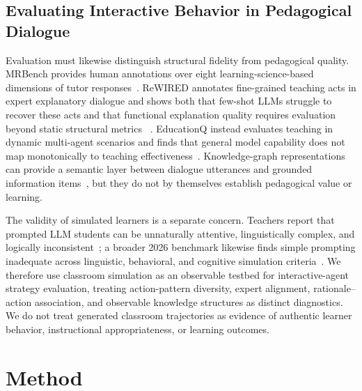 \documentclass[manuscript,review,anonymous]{acmart}
\begin{document}
\subsection{Evaluating Interactive Behavior in Pedagogical Dialogue}

Evaluation must likewise distinguish structural fidelity from pedagogical
quality. MRBench provides human annotations over eight learning-science-based
dimensions of tutor responses~\citep{maurya2025unifying}. ReWIRED annotates
fine-grained teaching acts in expert explanatory dialogue and shows both that
few-shot LLMs struggle to recover these acts and that functional explanation
quality requires evaluation beyond static structural metrics
~\citep{anagnostopoulou2025rewired}. EducationQ instead evaluates teaching in
dynamic multi-agent scenarios and finds that general model capability does not
map monotonically to teaching effectiveness~\citep{shi2025educationq}.
Knowledge-graph representations can provide a semantic layer between dialogue
utterances and grounded information items~\citep{schneider2024bridgekg}, but
they do not by themselves establish pedagogical value or learning.

The validity of simulated learners is a separate concern. Teachers report that
prompted LLM students can be unnaturally attentive, linguistically complex, and
logically inconsistent~\citep{martynova2025simulate}; a broader 2026 benchmark
likewise finds simple prompting inadequate across linguistic, behavioral, and
cognitive simulation criteria~\citep{scarlatos2026simulated}. We therefore use
classroom simulation as an observable testbed for interactive-agent strategy
evaluation, treating action-pattern diversity, expert alignment,
rationale--action association, and observable knowledge structures as distinct
diagnostics. We
do not treat generated classroom trajectories as evidence of authentic learner
behavior, instructional appropriateness, or learning outcomes.

\section{Method}
\end{document}
